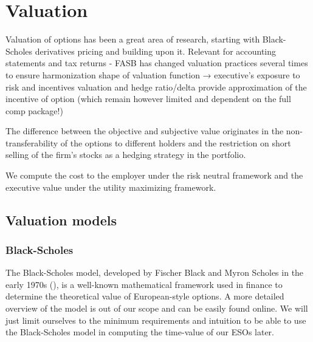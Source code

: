 \section{Valuation}
Valuation of options has been a great area of research, starting with Black-Scholes derivatives pricing and building upon it.
    Relevant for accounting statements and tax returns - FASB has changed valuation practices several times to ensure harmonization
    shape of valuation function → executive's exposure to risk and incentives
    valuation and hedge ratio/delta provide approximation of the incentive of option (which remain however limited and dependent on the full comp package!)

    The difference between the objective and subjective value originates in the non-transferability of the options to different holders and the restriction on short selling of the firm’s stocks as a hedging strategy in the portfolio.

    We compute the cost to the employer under the risk neutral framework and the executive value under the utility maximizing framework. 




\subsection{Valuation models} 

\subsubsection*{Black-Scholes}
    The Black-Scholes model, developed by Fischer Black and Myron Scholes in the early 1970s (\cite{black1973pricing}), is a well-known mathematical framework used in finance to determine the theoretical value of European-style options. A more detailed overview of the model is out of our scope and can be easily found online. We will just limit ourselves to the minimum requirements and intuition to be able to use the Black-Scholes model in computing the time-value of our ESOs later.
    
